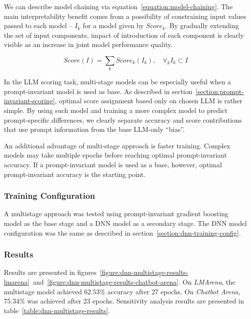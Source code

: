 \documentclass[a4paper,11pt,twoside]{report}
\theoremstyle{definition}
\begin{document}
We can describe model chaining via equation~\ref{equation:model-chaining}. The main interpretability benefit comes from a possibility of constraining input values passed to each model -- $I_k$ for a model given by $Score_k$. By gradually extending the set of input components, impact of introduction of each component is clearly visible as an increase in joint model performance quality. 

\begin{equation}
\label{equation:model-chaining}
    Score(I) = \sum_k Score_k(I_k), \quad \forall_k I_k \subset I
\end{equation}

In the LLM scoring task, multi-stage models can be especially useful when a prompt-invariant model is used as base. As described in section~\ref{section:prompt-invariant-scoring}, optimal score assignment based only on chosen LLM is rather simple. By using such model and training a more complex model to predict prompt-specific differences, we clearly separate accuracy and score contributions that use prompt information from the base LLM-only ``bias''.

An additional advantage of multi-stage approach is faster training. Complex models may take multiple epochs before reaching optimal prompt-invariant accuracy. If a prompt-invariant model is used as a base, however, optimal prompt-invariant accuracy is the starting point.

\subsubsection{Training Configuration}

A multistage approach was tested using prompt-invariant gradient boosting model as the base stage and a DNN model as a secondary stage. The DNN model configuration was the same as described in section~\ref{section:dnn-training-config}.

\subsubsection{Results}

Results are presented in figures~\ref{figure:dnn-multistage-results-lmarena}~and~\ref{figure:dnn-multistage-results-chatbot-arena}. On \textit{LMArena}, the multistage model achieved $62.53 \%$ accuracy after 27 epochs. On \textit{Chatbot Arena}, $75.34 \%$ was achieved after 23 epochs. Sensitivity analysis results are presented in table~\ref{table:dnn-multistage-results}.
\end{document}
